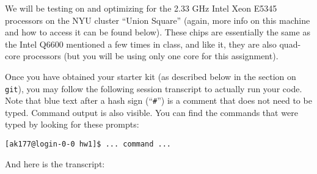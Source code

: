 \documentclass[11pt]{article}
\begin{document}
We will be testing on and optimizing for the 2.33 GHz Intel Xeon E5345
processors on the NYU cluster ``Union Square'' (again, more info on
this machine and how to access it can be found below). These chips are
essentially the same as the Intel Q6600 mentioned a few times in
class, and like it, they are also quad-core processors (but you will
be using only one core for this assignment).

Once you have obtained your starter kit (as described below in the
section on \texttt{git}), you may follow the following session
transcript to actually run your code. Note that blue text after a hash
sign (``\texttt{\#}'') is a comment that does not need to be typed.
Command output is also visible. You can find the commands that were
typed by looking for these prompts:
\begin{lstlisting}
[ak177@login-0-0 hw1]$ ... command ...
\end{lstlisting}

And here is the transcript:
\end{document}
